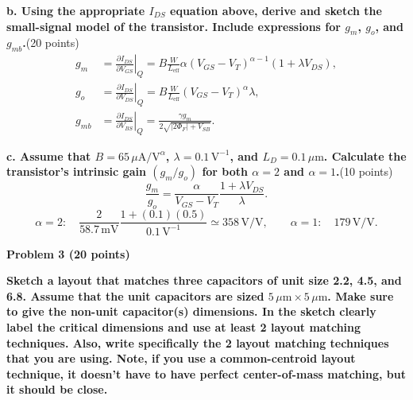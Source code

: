 \textbf{b. Using the appropriate $I_{DS}$ equation above, derive and sketch the small-signal model of the transistor. Include expressions for $g_m$, $g_o$, and $g_{mb}$.}\hfill(20 points)
\begin{align*}
g_m&=\left.\frac{\partial I_{DS}}{\partial V_{GS}}\right|_Q
 =B\frac W{L_{\mathrm{eff}}}\alpha(V_{GS}-V_T)^{\alpha-1}(1+\lambda V_{DS}),\\
g_o&=\left.\frac{\partial I_{DS}}{\partial V_{DS}}\right|_Q
 =B\frac W{L_{\mathrm{eff}}}(V_{GS}-V_T)^\alpha\lambda,\\
g_{mb}&=\left.\frac{\partial I_{DS}}{\partial V_{BS}}\right|_Q
 =\boxed{\frac{\gamma g_m}{2\sqrt{|2\Phi_F|+V_{SB}}}}.
\end{align*}
\begin{center}
\end{center}

\textbf{c. Assume that $B=65\,\mu\mathrm A/\mathrm V^\alpha$, $\lambda=0.1\,\mathrm V^{-1}$, and $L_D=0.1\,\mu\mathrm m$. Calculate the transistor's intrinsic gain $(g_m/g_o)$ for both $\alpha=2$ and $\alpha=1$.}\hfill(10 points)
\[
\frac{g_m}{g_o}=\frac{\alpha}{V_{GS}-V_T}\frac{1+\lambda V_{DS}}\lambda.
\]
\[
\alpha=2:\quad\frac2{58.7\,\mathrm{mV}}\frac{1+(0.1)(0.5)}{0.1\,\mathrm V^{-1}}
\simeq\boxed{358\,\mathrm{V/V}},\qquad
\alpha=1:\quad\boxed{179\,\mathrm{V/V}}.
\]
\endgroup
\newpage

\begingroup
\fontsize{11}{12.5}\selectfont
\setlength{\parskip}{6pt}
\textbf{Problem 3 (20 points)}\par
\textbf{Sketch a layout that matches three capacitors of unit size 2.2, 4.5, and 6.8. Assume that the unit capacitors are sized $5\,\mu\mathrm m\times5\,\mu\mathrm m$. Make sure to give the non-unit capacitor(s) dimensions. In the sketch clearly label the critical dimensions and use at least 2 layout matching techniques. Also, write specifically the 2 layout matching techniques that you are using. Note, if you use a common-centroid layout technique, it doesn't have to have perfect center-of-mass matching, but it should be close.}

